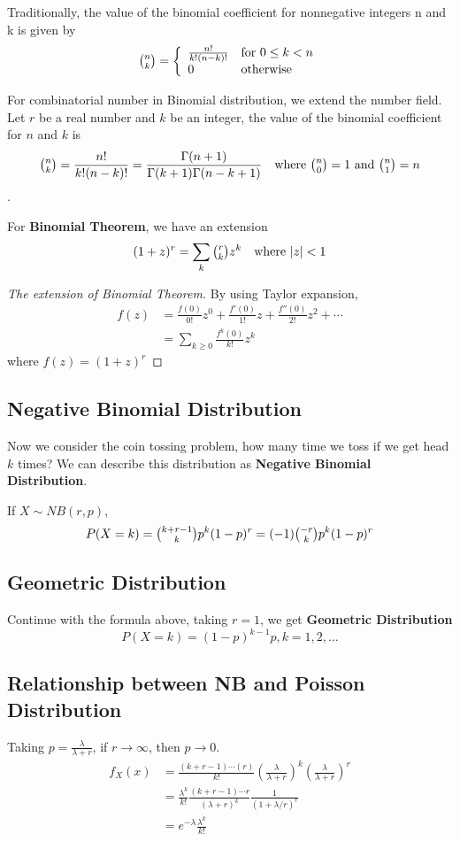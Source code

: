 		\begin{corollary}
			Traditionally, the value of the binomial coefficient for nonnegative integers n and k is given by
			\begin{eqnarray}
				\tbinom{n}{k}=\left\{
				\begin{array}{ll}
					\frac{n!}{k!(n-k)!} & \text{for } 0\leq k < n\\
					0 & \text{otherwise}
				\end{array}
				\right.
			\end{eqnarray}
			
			For combinatorial number in Binomial distribution, we extend the number field. Let $r$ be a real number and $k$ be an integer, the value of the binomial coefficient for $n$ and $k$ is $$\tbinom{n}{k}=\frac{n!}{k!(n-k)!}=\frac{\Gamma(n+1)}{\Gamma(k+1)\Gamma(n-k+1)} \quad \text{where } \tbinom{n}{0}=1 \text{ and } \tbinom{n}{1}=n$$.
			
			For \textbf{Binomial Theorem}, we have an extension
			$$(1+z)^r=\sum\limits_{k} \tbinom{r}{k}z^k \quad \text{where } |z|<1$$
		\end{corollary}
		\begin{proof}[The extension of Binomial Theorem]
			By using Taylor expansion, 
			\begin{align*}
				f(z) &= \frac{f(0)}{0!}z^0+\frac{f'(0)}{1!}z+\frac{f''(0)}{2!}z^2+\cdots \\
				     &=\sum\limits_{k\geq 0}\frac{f^k(0)}{k!}z^k
			\end{align*}			
		where $f(z)=(1+z)^r$
		\end{proof}
	
	\subsection{Negative Binomial Distribution}
	Now we consider the coin tossing problem, how many time we toss if we get head $k$ times? We can describe this distribution as \textbf{Negative Binomial Distribution}.
	
	If $X\sim NB(r,p)$, 
	$$P(X=k)=\tbinom{k+r-1}{k}p^k(1-p)^r=(-1)\tbinom{-r}{k}p^k(1-p)^{r}$$
	\subsection{Geometric Distribution}
	Continue with the formula above, taking $r=1$, we get \textbf{Geometric Distribution}
	$$P(X=k)=(1-p)^{k-1}p, k=1,2,\dots$$
	
	\subsection{Relationship between NB and Poisson Distribution}
	Taking $p=\frac{\lambda}{\lambda+r}$, if $r\to \infty$, then $p\to 0$.
	\begin{align*}
		f_X(x) &= \frac{(k+r-1)\cdots(r)}{k!}\left(\frac{\lambda}{\lambda+r}\right)^k\left(\frac{\lambda}{\lambda+r}\right)^r \\
		       &= \frac{\lambda^k}{k!}\frac{(k+r-1)\cdots r}{(\lambda+r)^k}\frac{1}{(1+\lambda/r)^r}\\
		       &=e^{-\lambda}\frac{\lambda^k}{k!}
	\end{align*}
